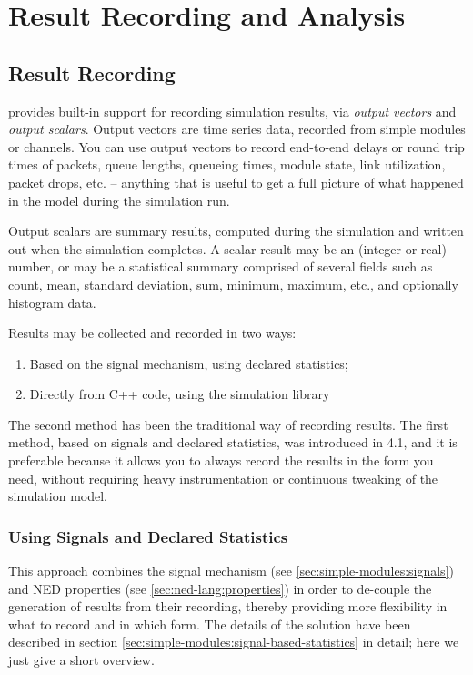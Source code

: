\chapter{Result Recording and Analysis}
\label{cha:ana-sim}

\section{Result Recording}
\label{sec:ana-sim:result-recording}

{\opp} provides built-in support for recording simulation results, via
\textit{output vectors} and \textit{output scalars}. Output vectors are
time series data, recorded from simple modules or channels. You can use
output vectors to record end-to-end delays or round trip times of packets,
queue lengths, queueing times, module state, link utilization, packet
drops, etc. -- anything that is useful to get a full picture of what
happened in the model during the simulation run.

Output scalars are summary results, computed during the simulation and
written out when the simulation completes. A scalar result may be an
(integer or real) number, or may be a statistical summary comprised of
several fields such as count, mean, standard deviation, sum, minimum,
maximum, etc., and optionally histogram data.

Results may be collected and recorded in two ways:

\begin{enumerate}
  \item Based on the signal mechanism, using declared statistics;
  \item Directly from C++ code, using the simulation library
\end{enumerate}

The second method has been the traditional way of recording results. The
first method, based on signals and declared statistics, was introduced in
{\opp} 4.1, and it is preferable because it allows you to always record the
results in the form you need, without requiring heavy instrumentation or
continuous tweaking of the simulation model.

\subsection{Using Signals and Declared Statistics}
\label{sec:ana-sim:signals-and-statistics}

This approach combines the signal mechanism (see
\ref{sec:simple-modules:signals}) and NED properties (see
\ref{sec:ned-lang:properties}) in order to de-couple the generation of
results from their recording, thereby providing more flexibility in what to
record and in which form. The details of the solution have been described
in section \ref{sec:simple-modules:signal-based-statistics} in detail; here we
just give a short overview.

